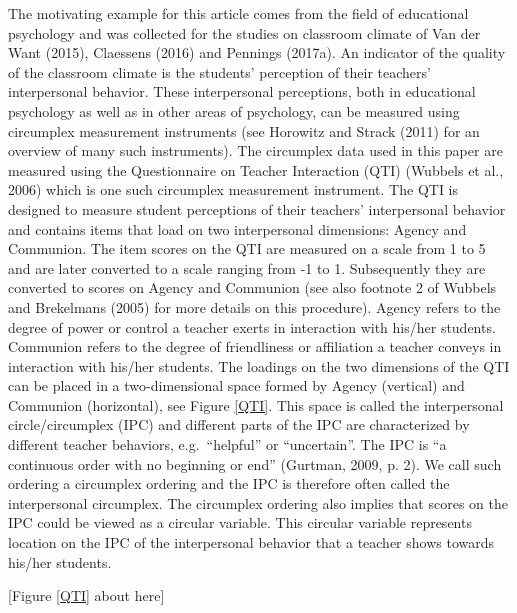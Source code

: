 \documentclass[man,mask]{apa6}
\DeclareRobustCommand{\VANDER}[3]{#2}
\begin{document}
The motivating example for this article comes from the field of educational
psychology and was collected for the studies on classroom climate of
\VANDER{Want}{Van der}{van der} Want (2015), Claessens (2016) and Pennings (2017a). An
indicator of the quality of the classroom climate is the students' perception of
their teachers' interpersonal behavior. These interpersonal perceptions, both in
educational psychology as well as in other areas of psychology, can be measured
using circumplex measurement instruments (see Horowitz and Strack (2011) for an
overview of many such instruments).\newline
\indent The circumplex data used in this paper are measured using the
Questionnaire on Teacher Interaction (QTI) (Wubbels et al., 2006) which is
one such circumplex measurement instrument. The QTI is designed to measure
student perceptions of their teachers' interpersonal behavior and contains items
that load on two interpersonal dimensions: Agency and Communion. The item scores
on the QTI are measured on a scale from 1 to 5 and are later converted to a
scale ranging from -1 to 1. Subsequently they are converted to scores on Agency
and Communion (see also footnote 2 of Wubbels and Brekelmans (2005) for more details on this
procedure). Agency refers to the degree of power or control a teacher exerts in
interaction with his/her students. Communion refers to the degree of
friendliness or affiliation a teacher conveys in interaction with his/her
students. The loadings on the two dimensions of the QTI can be placed in a
two-dimensional space formed by Agency (vertical) and Communion (horizontal),
see Figure \ref{QTI}. This space is called the interpersonal circle/circumplex
(IPC) and different parts of the IPC are characterized by different teacher
behaviors, e.g.~\enquote{helpful} or \enquote{uncertain}. The IPC is ``a continuous order with no
beginning or end'' (Gurtman, 2009, p. 2). We call such ordering a
circumplex ordering and the IPC is therefore often called the interpersonal
circumplex. The circumplex ordering also implies that scores on the IPC could be viewed as
a circular variable. This circular variable represents location on the IPC of
the interpersonal behavior that a teacher shows towards his/her students.

\hfil \hspace{2cm} {[}Figure \ref{QTI} about here{]} \hfil
\end{document}
